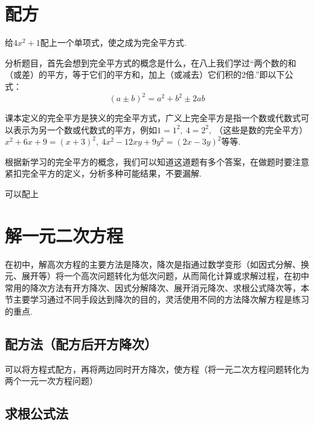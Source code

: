 \documentclass[lang=cn, 10pt, titlestyle=hang, oneside]{elegantbook}
\begin{document}
\section{配方}





\begin{example}
    给\( 4x^2 +1\)配上一个单项式，使之成为完全平方式.
\end{example}



分析题目，首先会想到完全平方式的概念是什么，在八上我们学过“两个数的和（或差）的平方，等于它们的平方和，加上（或减去）它们积的2倍.”即以下公式：
$$
(a\pm b)^2 = a^2+b^2\pm 2ab
$$



课本定义的完全平方是狭义的完全平方式，广义上完全平方是指一个数或代数式可以表示为另一个数或代数式的平方，例如\( 1=1^2,\ 4=2^2,\ \)（这些是数的完全平方）\(x^2+6x+9=(x+3)^2,\ 4x^2-12xy+9y^2=(2x-3y)^2\)等等.



根据新学习的完全平方的概念，我们可以知道这道题有多个答案，在做题时要注意紧扣完全平方的定义，分析多种可能结果，不要漏解.
\begin{solution}
    可以配上
\end{solution}

\section{解一元二次方程}
在初中，解高次方程的主要方法是降次，降次是指通过数学变形（如因式分解、换元、展开等）将一个高次问题转化为低次问题，从而简化计算或求解过程，在初中常用的降次方法有开方降次、因式分解降次、展开消元降次、求根公式降次等，本节主要学习通过不同手段达到降次的目的，灵活使用不同的方法降次解方程是练习的重点.
\subsection{配方法（配方后开方降次）}





可以将方程式配方，再将两边同时开方降次，使方程（将一元二次方程问题转化为两个一元一次方程问题）

\subsection{求根公式法}
\end{document}
